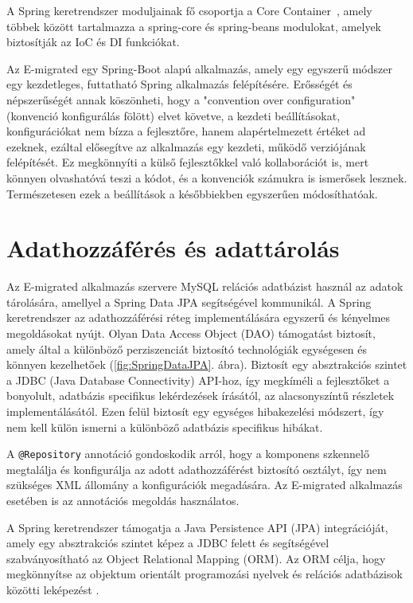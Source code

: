 A Spring keretrendszer moduljainak fő csoportja a Core Container~\cite{SpringCore}, amely többek között tartalmazza  a spring-core és spring-beans modulokat, amelyek biztosítják az IoC és DI funkciókat.

Az E-migrated egy Spring-Boot alapú alkalmazás, amely egy egyszerű módszer egy kezdetleges, futtatható Spring alkalmazás felépítésére. Erősségét és népszerűségét annak köszönheti, hogy a "convention over configuration" \cite{Convention} (konvenció konfigurálás fölött) elvet követve, a kezdeti beállításokat, konfigurációkat nem bízza a fejlesztőre, hanem alapértelmezett értéket ad ezeknek, ezáltal elősegítve az alkalmazás egy kezdeti, működő verziójának felépítését. Ez megkönnyíti a külső fejlesztőkkel való kollaborációt is, mert könnyen olvashatóvá teszi a kódot, és a konvenciók számukra is ismerősek lesznek. Természetesen ezek a beállítások a későbbiekben egyszerűen módosíthatóak.\cite{SpringBoot}
\section{Adathozzáférés és adattárolás}
\label{subsec:Adathozzáférés}
Az E-migrated alkalmazás szervere MySQL relációs adatbázist használ az adatok tárolására, amellyel a Spring Data JPA segítségével kommunikál. A Spring keretrendszer az adathozzáférési réteg implementálására egyszerű és kényelmes megoldásokat nyújt. Olyan Data Access Object (DAO) támogatást biztosít, amely által a különböző  perziszenciát biztosító technológiák egységesen és könnyen kezelhetőek (\ref{fig:SpringDataJPA}. ábra). Biztosít egy absztrakciós szintet a  JDBC (Java Database Connectivity) API-hoz, így megkíméli a fejlesztőket a bonyolult, adatbázis specifikus lekérdezések írásától, az alacsonyszíntű részletek implementálásától. Ezen felül biztosít egy egységes hibakezelési módszert, így nem kell külön ismerni a különböző adatbázis specifikus hibákat. 

A \texttt{@Repository} annotáció gondoskodik arról, hogy a komponens szkennelő megtalálja és konfigurálja az adott adathozzáférést biztosító osztályt, így nem szükséges XML állomány a konfigurációk megadására. Az E-migrated alkalmazás esetében is az annotációs megoldás használatos.

A Spring keretrendszer támogatja  a Java Persistence API (JPA) integrációját, amely egy absztrakciós szintet képez a JDBC felett és segítségével szabványosítható az Object Relational Mapping (ORM).  Az ORM célja, hogy megkönnyítse az objektum orientált programozási nyelvek és relációs adatbázisok közötti leképezést \cite{DataAccess}.

